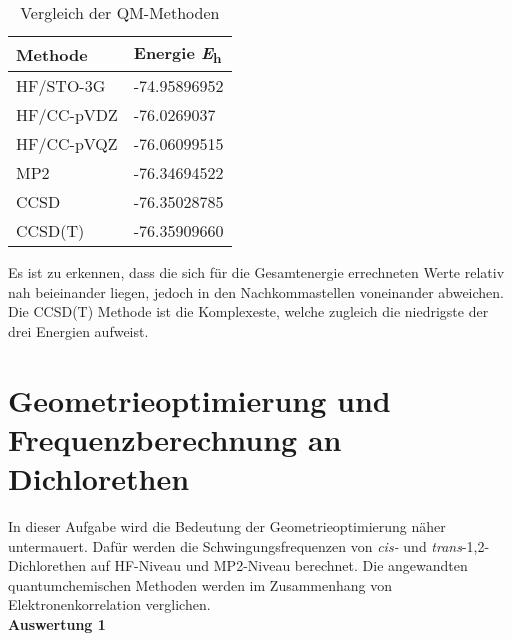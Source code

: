 \documentclass[12pt]{article}
\begin{document}
\begin{onehalfspace}
\begin{table}[!htpb]
\centering
\caption{ Vergleich der QM-Methoden}
\begin{tabular}{ll}
\toprule
Methode &   Energie \si{\hartree} \\
\midrule
HF/STO-3G & -74.95896952 \\
HF/CC-pVDZ& -76.0269037\\
HF/CC-pVQZ& -76.06099515\\
MP2 & -76.34694522\\
CCSD & -76.35028785 \\
CCSD(T) & -76.35909660\\
\bottomrule
\end{tabular}
\end{table}
\noindent
Es ist zu erkennen, dass die sich für die Gesamtenergie errechneten Werte
relativ nah beieinander liegen,
jedoch in den Nachkommastellen voneinander abweichen.
Die CCSD(T) Methode ist die Komplexeste, welche zugleich die niedrigste der drei Energien aufweist.

\section{Geometrieoptimierung und Frequenzberechnung an Dichlorethen}
In dieser Aufgabe wird die Bedeutung der Geometrieoptimierung näher untermauert.
Dafür werden die Schwingungsfrequenzen von \textit{cis-} und \textit{trans}-1,2-Dichlorethen auf HF-Niveau und MP2-Niveau berechnet.
Die angewandten quantumchemischen Methoden werden im Zusammenhang von Elektronenkorrelation verglichen.\\
\textbf{Auswertung 1 }
\begin{figure}[!hptb]
    \caption{Die optimierten Geometrien}
    \begin{subfigure}[b]{0.4\textwidth}
    \end{subfigure}
    ~ %
    \begin{subfigure}[b]{0.4\textwidth}
    \end{subfigure}
    \label{figure:opt}
\end{figure}



\end{onehalfspace}
\end{document}
